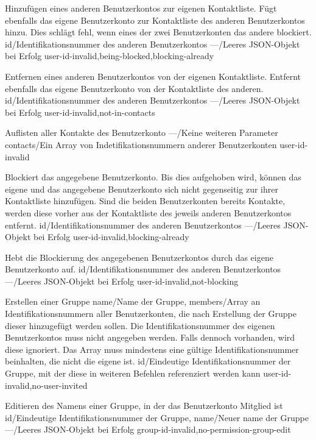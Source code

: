\documentclass[parskip=full,11pt]{scrartcl}
\begin{document}
{Hinzufügen eines anderen Benutzerkontos zur eigenen Kontaktliste.
Fügt ebenfalls das eigene Benutzerkonto zur Kontaktliste des anderen
Benutzerkontos hinzu.
Dies schlägt fehl, wenn eines der zwei Benutzerkonten das andere blockiert.}
{id/Identifikationsnummer des anderen Benutzerkontos}
{---/Leeres JSON-Objekt bei Erfolg}
{user-id-invalid,being-blocked,blocking-already}

{Entfernen eines anderen Benutzerkontos von der eigenen Kontaktliste.
Entfernt ebenfalls das eigene Benutzerkonto von der Kontaktliste des anderen.}
{id/Identifikationsnummer des anderen Benutzerkontos}
{---/Leeres JSON-Objekt bei Erfolg}
{user-id-invalid,not-in-contacts}

{Auflisten aller Kontakte des Benutzerkonto}
{---/Keine weiteren Parameter}
{contacts/Ein Array von Indetifikationsnummern anderer Benutzerkonten}
{user-id-invalid}

{Blockiert das angegebene Benutzerkonto.
Bis dies aufgehoben wird, können das eigene und das angegebene
Benutzerkonto sich nicht gegenseitig zur ihrer Kontaktliste hinzufügen.
Sind die beiden Benutzerkonten bereits Kontakte, werden diese vorher aus der
Kontaktliste des jeweils anderen Benutzerkontos entfernt.}
{id/Identifikationsnummer des anderen Benutzerkontos}
{---/Leeres JSON-Objekt bei Erfolg}
{user-id-invalid,blocking-already}

{Hebt die Blockierung des angegebenen Benutzerkontos durch das eigene
Benutzerkonto auf.}
{id/Identifikationsnummer des anderen Benutzerkontos}
{---/Leeres JSON-Objekt bei Erfolg}
{user-id-invalid,not-blocking}

{Erstellen einer Gruppe}
{name/Name der Gruppe,
members/Array an Identifikationsnummern aller Benutzerkonten{,} die nach
Erstellung der Gruppe dieser hinzugefügt werden sollen.
Die Identifikationsnummer des eigenen Benutzerkontos muss nicht angegeben
werden.
Falls dennoch vorhanden{,} wird diese ignoriert.
Das Array muss mindestens eine gültige Identifikationsnummer beinhalten{,} die
nicht die eigene ist.}
{id/Eindeutige Identifikationsnummer der Gruppe{,} mit der diese in
weiteren Befehlen referenziert werden kann}
{user-id-invalid,no-user-invited}

{Editieren des Namens einer Gruppe, in der das Benutzerkonto Mitglied ist}
{id/Eindeutige Identifikationsnummer der Gruppe,
name/Neuer name der Gruppe}
{---/Leeres JSON-Objekt bei Erfolg}
{group-id-invalid,no-permission-group-edit}
\end{document}

